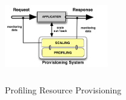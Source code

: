 
\begin{figure}
\begin{center}
\includegraphics[width=0.4\textwidth, height=4cm]{./images/monitoringSchema.jpg}
\end{center}
\label{model}
\caption{Profiling Resource Provisioning}
\end{figure}
